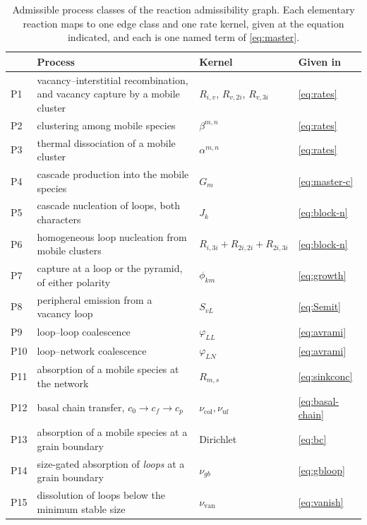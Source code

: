 \begin{table}[!ht]
\caption{Admissible process classes of the reaction admissibility graph. Each
elementary reaction maps to one edge class and one rate kernel, given at the
equation indicated, and each is one named term of \cref{eq:master}.}
\label{tab:rag-processes}
\centering\scriptsize
\setlength{\tabcolsep}{4pt}\renewcommand{\arraystretch}{0.92}
\begin{tabularx}{\textwidth}{@{}l>{\raggedright\arraybackslash}p{}Xl@{}}
\toprule
& Process & Kernel & Given in \\
\midrule
P1  & vacancy--interstitial recombination, and vacancy capture by a mobile
      cluster & $R_{i,v}$, $R_{v,2i}$, $R_{v,3i}$ & \cref{eq:rates} \\
P2  & clustering among mobile species & $\beta^{m,n}$ & \cref{eq:rates} \\
P3  & thermal dissociation of a mobile cluster & $\alpha^{m,n}$ &
      \cref{eq:rates} \\
P4  & cascade production into the mobile species & $G_m$ & \cref{eq:master-c} \\
P5  & cascade nucleation of loops, both characters & $J_k$ & \cref{eq:block-n} \\
P6  & homogeneous loop nucleation from mobile clusters &
      $R_{i,3i}+R_{2i,2i}+R_{2i,3i}$ & \cref{eq:block-n} \\
P7  & capture at a loop or the pyramid, of either polarity & $\phi_{km}$ &
      \cref{eq:growth} \\
P8  & peripheral emission from a vacancy loop & $S_{vL}$ & \cref{eq:Semit} \\
P9  & loop--loop coalescence & $\varphi_{LL}$ & \cref{eq:avrami} \\
P10 & loop--network coalescence & $\varphi_{LN}$ & \cref{eq:avrami} \\
P11 & absorption of a mobile species at the network & $R_{m,s}$ &
      \cref{eq:sinkconc} \\
P12 & basal chain transfer, $c_0\to c_f\to c_p$ &
      $\nu_{\mathrm{col}},\nu_{\mathrm{uf}}$ & \cref{eq:basal-chain} \\
P13 & absorption of a mobile species at a grain boundary & Dirichlet &
      \cref{eq:bc} \\
P14 & size-gated absorption of \emph{loops} at a grain boundary & $\nu_{gb}$ &
      \cref{eq:gbloop} \\
P15 & dissolution of loops below the minimum stable size &
      $\nu_{\mathrm{van}}$ & \cref{eq:vanish} \\
\bottomrule
\end{tabularx}
\end{table}
\FloatBarrier


